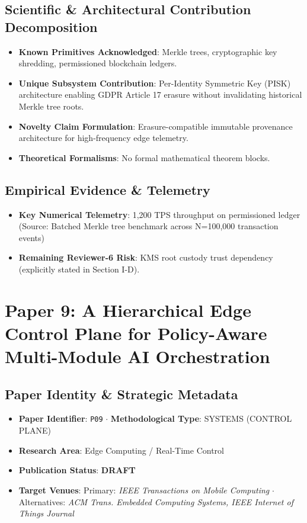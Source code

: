 \documentclass[11pt,a4paper]{article}
\begin{document}
\subsection*{Scientific & Architectural Contribution Decomposition}
\begin{itemize}[leftmargin=1.5em, itemsep=0.2em]
    \item \textbf{Known Primitives Acknowledged}: Merkle trees, cryptographic key shredding, permissioned blockchain ledgers.
    \item \textbf{Unique Subsystem Contribution}: Per-Identity Symmetric Key (PISK) architecture enabling GDPR Article 17 erasure without invalidating historical Merkle tree roots.
    \item \textbf{Novelty Claim Formulation}: Erasure-compatible immutable provenance architecture for high-frequency edge telemetry.
    \item \textbf{Theoretical Formalisms}: No formal mathematical theorem blocks.
\end{itemize}

\subsection*{Empirical Evidence & Telemetry}
\begin{itemize}[leftmargin=1.5em, itemsep=0.2em]
    \item \textbf{Key Numerical Telemetry}: 1,200 TPS throughput on permissioned ledger (Source: Batched Merkle tree benchmark across N=100,000 transaction events)
    \item \textbf{Remaining Reviewer-6 Risk}: KMS root custody trust dependency (explicitly stated in Section I-D).
\end{itemize}

\section{Paper 9: A Hierarchical Edge Control Plane for Policy-Aware Multi-Module AI Orchestration}

\subsection*{Paper Identity \& Strategic Metadata}
\begin{itemize}[leftmargin=1.5em, itemsep=0.2em]
    \item \textbf{Paper Identifier}: \texttt{P09} $\cdot$ \textbf{Methodological Type}: SYSTEMS (CONTROL PLANE)
    \item \textbf{Research Area}: Edge Computing / Real-Time Control
    \item \textbf{Publication Status}: \textbf{DRAFT}
    \item \textbf{Target Venues}: Primary: \textit{IEEE Transactions on Mobile Computing} $\cdot$ Alternatives: \textit{ACM Trans. Embedded Computing Systems, IEEE Internet of Things Journal}
\end{itemize}
\end{document}

